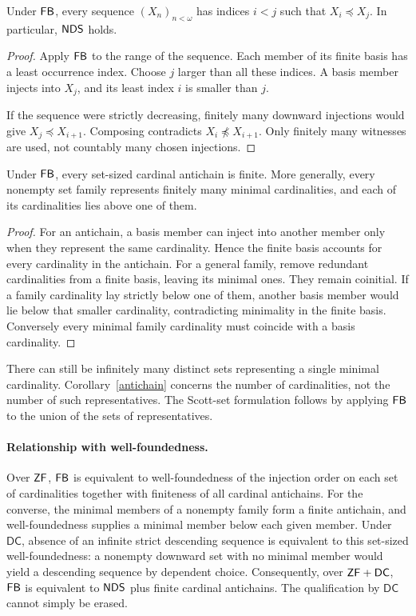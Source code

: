 \begin{corollary}\label{seq}
Under $\mathsf{FB}$, every sequence $(X_n)_{n<\omega}$ has indices $i<j$ such that $X_i\preccurlyeq X_j$. In particular, $\mathsf{NDS}$ holds.
\end{corollary}
\begin{proof}
Apply $\mathsf{FB}$ to the range of the sequence. Each member of its finite basis has a least occurrence index. Choose $j$ larger than all these indices. A basis member injects into $X_j$, and its least index $i$ is smaller than $j$.

If the sequence were strictly decreasing, finitely many downward injections would give $X_j\preccurlyeq X_{i+1}$. Composing contradicts $X_i\not\preccurlyeq X_{i+1}$. Only finitely many witnesses are used, not countably many chosen injections.
\end{proof}

\begin{corollary}\label{antichain}
Under $\mathsf{FB}$, every set-sized cardinal antichain is finite. More generally, every nonempty set family represents finitely many minimal cardinalities, and each of its cardinalities lies above one of them.
\end{corollary}
\begin{proof}
For an antichain, a basis member can inject into another member only when they represent the same cardinality. Hence the finite basis accounts for every cardinality in the antichain. For a general family, remove redundant cardinalities from a finite basis, leaving its minimal ones. They remain coinitial. If a family cardinality lay strictly below one of them, another basis member would lie below that smaller cardinality, contradicting minimality in the finite basis. Conversely every minimal family cardinality must coincide with a basis cardinality.
\end{proof}

There can still be infinitely many distinct sets representing a single minimal cardinality. Corollary~\ref{antichain} concerns the number of cardinalities, not the number of such representatives. The Scott-set formulation follows by applying $\mathsf{FB}$ to the union of the sets of representatives.


\paragraph{Relationship with well-foundedness.} Over $\mathsf{ZF}$, $\mathsf{FB}$ is equivalent to well-foundedness of the injection order on each set of cardinalities together with finiteness of all cardinal antichains. For the converse, the minimal members of a nonempty family form a finite antichain, and well-foundedness supplies a minimal member below each given member. Under $\mathsf{DC}$, absence of an infinite strict descending sequence is equivalent to this set-sized well-foundedness: a nonempty downward set with no minimal member would yield a descending sequence by dependent choice. Consequently, over $\mathsf{ZF}+\mathsf{DC}$, $\mathsf{FB}$ is equivalent to $\mathsf{NDS}$ plus finite cardinal antichains. The qualification by $\mathsf{DC}$ cannot simply be erased.

